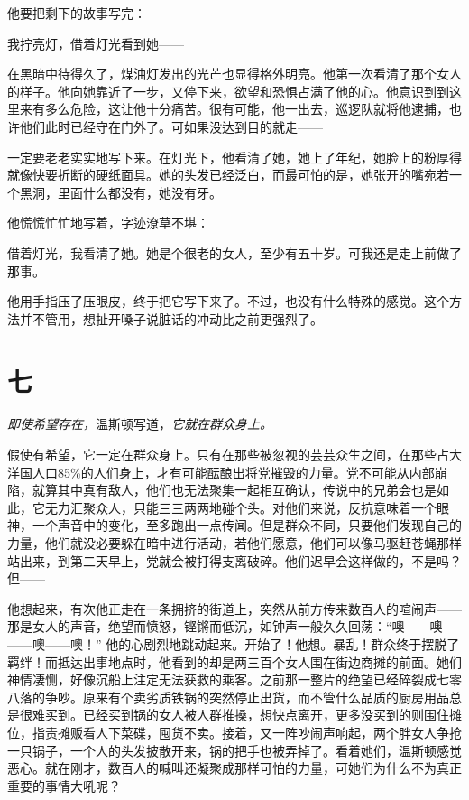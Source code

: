 他要把剩下的故事写完：

我拧亮灯，借着灯光看到她——

在黑暗中待得久了，煤油灯发出的光芒也显得格外明亮。他第一次看清了那个女人的样子。他向她靠近了一步，又停下来，欲望和恐惧占满了他的心。他意识到到这里来有多么危险，这让他十分痛苦。很有可能，他一出去，巡逻队就将他逮捕，也许他们此时已经守在门外了。可如果没达到目的就走——

一定要老老实实地写下来。在灯光下，他看清了她，她上了年纪，她脸上的粉厚得就像快要折断的硬纸面具。她的头发已经泛白，而最可怕的是，她张开的嘴宛若一个黑洞，里面什么都没有，她没有牙。

他慌慌忙忙地写着，字迹潦草不堪：

借着灯光，我看清了她。她是个很老的女人，至少有五十岁。可我还是走上前做了那事。

他用手指压了压眼皮，终于把它写下来了。不过，也没有什么特殊的感觉。这个方法并不管用，想扯开嗓子说脏话的冲动比之前更强烈了。

\section*{七}\label{ux4e03}

\emph{即使希望存在，}温斯顿写道，\emph{它就在群众身上。}

\sectionbreak

假使有希望，它一定在群众身上。只有在那些被忽视的芸芸众生之间，在那些占大洋国人口85\%的人们身上，才有可能酝酿出将党摧毁的力量。党不可能从内部崩陷，就算其中真有敌人，他们也无法聚集一起相互确认，传说中的兄弟会也是如此，它无力汇聚众人，只能三三两两地碰个头。对他们来说，反抗意味着一个眼神，一个声音中的变化，至多跑出一点传闻。但是群众不同，只要他们发现自己的力量，他们就没必要躲在暗中进行活动，若他们愿意，他们可以像马驱赶苍蝇那样站出来，到第二天早上，党就会被打得支离破碎。他们迟早会这样做的，不是吗？但——

他想起来，有次他正走在一条拥挤的街道上，突然从前方传来数百人的喧闹声——那是女人的声音，绝望而愤怒，铿锵而低沉，如钟声一般久久回荡：``噢——噢——噢——噢！''
他的心剧烈地跳动起来。开始了！他想。暴乱！群众终于摆脱了羁绊！而抵达出事地点时，他看到的却是两三百个女人围在街边商摊的前面。她们神情凄恻，好像沉船上注定无法获救的乘客。之前那一整片的绝望已经碎裂成七零八落的争吵。原来有个卖劣质铁锅的突然停止出货，而不管什么品质的厨房用品总是很难买到。已经买到锅的女人被人群推搡，想快点离开，更多没买到的则围住摊位，指责摊贩看人下菜碟，囤货不卖。接着，又一阵吵闹声响起，两个胖女人争抢一只锅子，一个人的头发披散开来，锅的把手也被弄掉了。看着她们，温斯顿感觉恶心。就在刚才，数百人的喊叫还凝聚成那样可怕的力量，可她们为什么不为真正重要的事情大吼呢？

